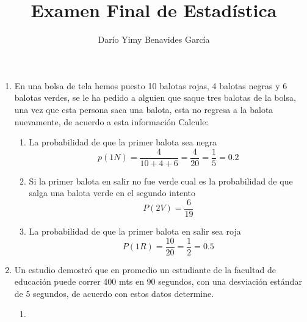\documentclass[10pt,a4paper]{article}
\author{Darío Yimy Benavides García}
\title{Examen Final de Estadística}
\begin{document}
\begin{enumerate}
\item En una bolsa de tela hemos puesto 10 balotas rojas, 4 balotas negras y 6 balotas verdes, se le ha pedido a alguien que saque tres balotas de la bolsa, una vez que esta persona saca una balota, esta no regresa a la balota nuevamente, de acuerdo a esta información Calcule:
\begin{enumerate}
\item La probabilidad de que la primer balota sea negra
\[p(1N)=\dfrac{4}{10+4+6}=\dfrac{4}{20}=\dfrac{1}{5}=0.2\]
\item Si la primer balota en salir no fue verde cual es la probabilidad de que salga una balota verde en el segundo intento
\[P(2V)=\dfrac{6}{19}\]
\item La probabilidad de que la primer balota en salir sea roja
\[P(1R)=\dfrac{10}{20}=\dfrac{1}{2}=0.5\]
\end{enumerate}
\item Un estudio demostró que en promedio un estudiante de la facultad de educación puede correr 400 mts en 90 segundos, con una desviación estándar de 5 segundos, de acuerdo con estos datos determine.
\begin{enumerate}
\item 
\end{enumerate}
\end{enumerate}
\end{document}
